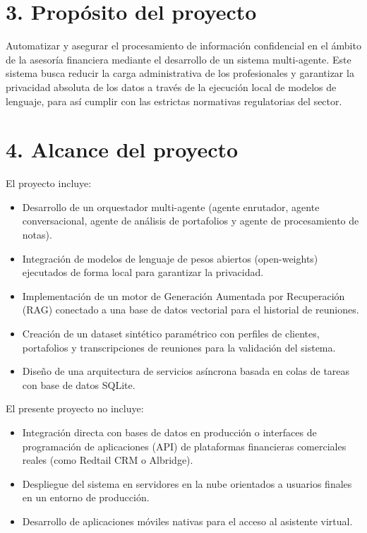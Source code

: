 \documentclass[
11pt, %
]{charter}
\begin{document}
\section{3. Propósito del proyecto}
\label{sec:proposito}

Automatizar y asegurar el procesamiento de información confidencial en el ámbito de la asesoría financiera mediante el desarrollo de un sistema multi-agente. Este sistema busca reducir la carga administrativa de los profesionales y garantizar la privacidad absoluta de los datos a través de la ejecución local de modelos de lenguaje, para así cumplir con las estrictas normativas regulatorias del sector.

\section{4. Alcance del proyecto}
\label{sec:alcance}

El proyecto incluye:
\begin{itemize}
    \item Desarrollo de un orquestador multi-agente (agente enrutador, agente conversacional, agente de análisis de portafolios y agente de procesamiento de notas).
    \item Integración de modelos de lenguaje de pesos abiertos (open-weights) ejecutados de forma local para garantizar la privacidad.
    \item Implementación de un motor de Generación Aumentada por Recuperación (RAG) conectado a una base de datos vectorial para el historial de reuniones.
    \item Creación de un dataset sintético paramétrico con perfiles de clientes, portafolios y transcripciones de reuniones para la validación del sistema.
    \item Diseño de una arquitectura de servicios asíncrona basada en colas de tareas con base de datos SQLite.
\end{itemize}

El presente proyecto no incluye:
\begin{itemize}
    \item Integración directa con bases de datos en producción o interfaces de programación de aplicaciones (API) de plataformas financieras comerciales reales (como Redtail CRM o Albridge).
    \item Despliegue del sistema en servidores en la nube orientados a usuarios finales en un entorno de producción.
    \item Desarrollo de aplicaciones móviles nativas para el acceso al asistente virtual.
\end{itemize}
\end{document}
